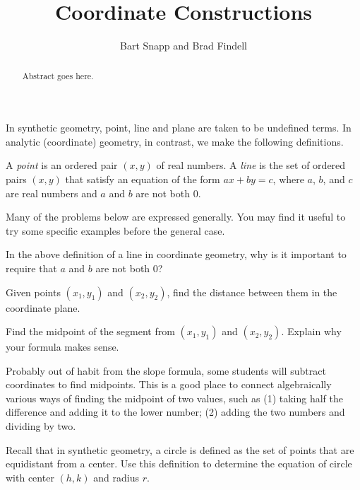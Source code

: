 \documentclass{ximera}
\title{Coordinate Constructions}
\author{Bart Snapp and Brad Findell}
\begin{document}
\begin{abstract}
Abstract goes here.  
\end{abstract}
\maketitle

In synthetic geometry, point, line and plane are taken to be undefined terms.  In analytic (coordinate) geometry, in contrast, we make the following definitions.  
\begin{definition}
A \emph{point} is an ordered pair $(x,y)$ of real numbers. A \emph{line} is the set of ordered pairs $(x,y)$ that satisfy an equation of the form $ax + by = c$, where $a$, $b$, and $c$ are real numbers and $a$ and $b$ are not both 0.   
\end{definition}

Many of the problems below are expressed generally.  You may find it useful to try some specific examples before the general case.  


\begin{problem}
In the above definition of a line in coordinate geometry, why is it important to require that $a$ and $b$ are not both 0?  
\end{problem}

\begin{problem}
Given points $(x_1, y_1)$ and $(x_2, y_2)$, find the distance between them in the coordinate plane.
\end{problem}

\begin{problem}
Find the midpoint of the segment from $(x_1, y_1)$ and $(x_2, y_2)$.  Explain why your formula makes sense. 
\end{problem}

\begin{teachingnote}
Probably out of habit from the slope formula, some students will subtract coordinates to find midpoints.  This is a good place to connect algebraically various ways of finding the midpoint of two values, such as (1) taking half the difference and adding it to the lower number; (2) adding the two numbers and dividing by two. 
\end{teachingnote}   

\begin{problem}
Recall that in synthetic geometry, a circle is defined as the set of points that are equidistant from a center.  Use this definition to determine the equation of circle with center $(h, k)$ and radius $r$.%
\end{problem}
\end{document}
